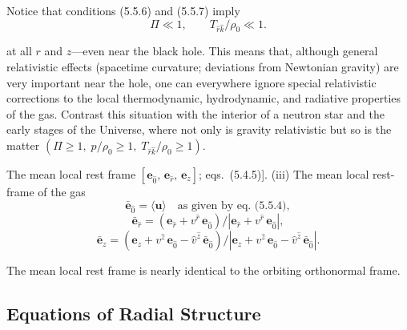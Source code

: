 Notice that conditions (5.5.6) and (5.5.7) imply
%
\begin{equation}
\Pi \ll 1, \qquad T_{\hat{r}\hat{k}}/\rho_0 \ll 1.
\tag{5.5.8}
\end{equation}

at all $r$ and $z$---even near the black hole.  This means that, although
general relativistic effects (spacetime curvature; deviations from
Newtonian gravity) are very important near the hole, one can everywhere
ignore special relativistic corrections to the local thermodynamic,
hydrodynamic, and radiative properties of the gas.  Contrast this
situation with the interior of a neutron star and the early stages of the
Universe, where not only is gravity relativistic but so is the matter
$(\Pi \geq 1,\; p/\rho_0 \geq 1,\; T_{\hat{r}\hat{k}}/\rho_0 \geq 1)$.

The mean local rest frame
$[\mathbf{e}_{\hat{0}},\,\mathbf{e}_{\hat{r}},\,\mathbf{e}_z]$;
eqs.\ (5.4.5)].  (iii)  The mean local rest-
frame of the gas
%
\begin{equation}
\bar{\mathbf{e}}_{\hat{0}} = \langle\mathbf{u}\rangle\quad
\text{as given by eq.\ (5.5.4)},
\end{equation}
%
\begin{equation}
\bar{\mathbf{e}}_{\hat{r}} = (\mathbf{e}_{\hat{r}} + v^{\hat{r}}\,\mathbf{e}_{\hat{0}})
/|\mathbf{e}_{\hat{r}} + v^{\hat{r}}\,\mathbf{e}_{\hat{0}}|,
\end{equation}
%
\begin{equation}
\bar{\mathbf{e}}_z = (\mathbf{e}_z + v^{\hat{z}}\,\mathbf{e}_{\hat{0}}
- \hat{v}^{\hat{z}}\,\bar{\mathbf{e}}_{\hat{0}})/
|\mathbf{e}_z + v^{\hat{z}}\,\mathbf{e}_{\hat{0}}
- \hat{v}^{\hat{z}}\,\bar{\mathbf{e}}_{\hat{0}}|.
\tag{5.5.9}
\end{equation}

The mean local rest frame is nearly identical to the orbiting orthonormal frame.

\subsection{Equations of Radial Structure}
\label{sec:5.6}

